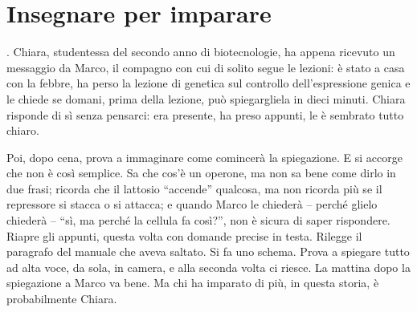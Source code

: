 %
\chapter{Insegnare per imparare}
\label{cap:insegnare}


. Chiara, studentessa del secondo anno di
biotecnologie, ha appena ricevuto un messaggio da Marco, il compagno con
cui di solito segue le lezioni: è stato a casa con la febbre, ha perso
la lezione di genetica sul controllo dell'espressione genica e le chiede
se domani, prima della lezione, può spiegargliela in dieci minuti. Chiara
risponde di sì senza pensarci: era presente, ha preso appunti, le è
sembrato tutto chiaro.

Poi, dopo cena, prova a immaginare come comincerà la spiegazione. E si
accorge che non è così semplice. Sa che cos'è un operone, ma non sa
bene come dirlo in due frasi; ricorda che il lattosio \enquote{accende}
qualcosa, ma non ricorda più se il repressore si stacca o si attacca;
e quando Marco le chiederà -- perché glielo chiederà -- \enquote{sì, ma
perché la cellula fa così?}, non è sicura di saper rispondere. Riapre
gli appunti, questa volta con domande precise in testa. Rilegge il
paragrafo del manuale che aveva saltato. Si fa uno schema. Prova a
spiegare tutto ad alta voce, da sola, in camera, e alla seconda volta ci
riesce. La mattina dopo la spiegazione a Marco va bene. Ma chi ha
imparato di più, in questa storia, è probabilmente Chiara.

